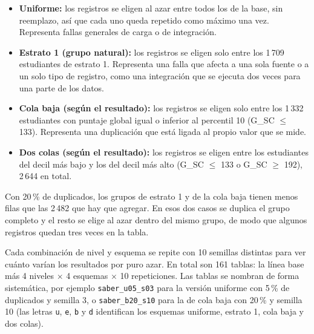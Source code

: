 \documentclass[11pt,openany,oneside,letterpaper]{book}
\begin{document}
\begin{itemize}
 \item \textbf{Uniforme:} los registros se eligen al azar entre todos los de la base, sin reemplazo, así que cada uno queda repetido como máximo una vez. Representa fallas generales de carga o de integración.
 \item \textbf{Estrato 1 (grupo natural):} los registros se eligen solo entre los 1\,709 estudiantes de estrato 1. Representa una falla que afecta a una sola fuente o a un solo tipo de registro, como una integración que se ejecuta dos veces para una parte de los datos.
 \item \textbf{Cola baja (según el resultado):} los registros se eligen solo entre los 1\,332 estudiantes con puntaje global igual o inferior al percentil 10 (G\_SC $\leq$ 133). Representa una duplicación que está ligada al propio valor que se mide.
 \item \textbf{Dos colas (según el resultado):} los registros se eligen entre los estudiantes del decil más bajo y los del decil más alto (G\_SC $\leq$ 133 o G\_SC $\geq$ 192), 2\,644 en total.
\end{itemize}

Con 20\,\% de duplicados, los grupos de estrato 1 y de la cola baja tienen menos filas que las 2\,482 que hay que agregar. En esos dos casos se duplica el grupo completo y el resto se elige al azar dentro del mismo grupo, de modo que algunos registros quedan tres veces en la tabla.

Cada combinación de nivel y esquema se repite con 10 semillas distintas para ver cuánto varían los resultados por puro azar. En total son 161 tablas: la línea base más 4 niveles $\times$ 4 esquemas $\times$ 10 repeticiones. Las tablas se nombran de forma sistemática, por ejemplo \texttt{saber\_u05\_s03} para la versión uniforme con 5\,\% de duplicados y semilla 3, o \texttt{saber\_b20\_s10} para la de cola baja con 20\,\% y semilla 10 (las letras \texttt{u}, \texttt{e}, \texttt{b} y \texttt{d} identifican los esquemas uniforme, estrato 1, cola baja y dos colas).
\end{document}
